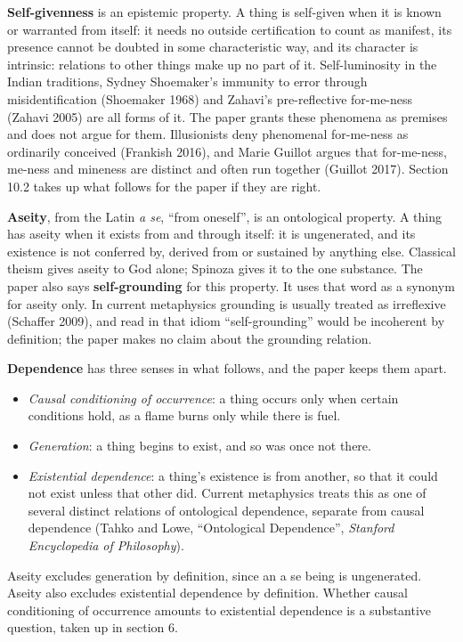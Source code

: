 \documentclass[11pt]{article}
\begin{document}
\textbf{Self-givenness} is an epistemic property. A thing is self-given when it is known or warranted from itself: it needs no outside certification to count as manifest, its presence cannot be doubted in some characteristic way, and its character is intrinsic: relations to other things make up no part of it. Self-luminosity in the Indian traditions, Sydney Shoemaker's immunity to error through misidentification (Shoemaker 1968) and Zahavi's pre-reflective for-me-ness (Zahavi 2005) are all forms of it. The paper grants these phenomena as premises and does not argue for them. Illusionists deny phenomenal for-me-ness as ordinarily conceived (Frankish 2016), and Marie Guillot argues that for-me-ness, me-ness and mineness are distinct and often run together (Guillot 2017). Section 10.2 takes up what follows for the paper if they are right.

\textbf{Aseity}, from the Latin \emph{a se}, ``from oneself'', is an ontological property. A thing has aseity when it exists from and through itself: it is ungenerated, and its existence is not conferred by, derived from or sustained by anything else. Classical theism gives aseity to God alone; Spinoza gives it to the one substance. The paper also says \textbf{self-grounding} for this property. It uses that word as a synonym for aseity only. In current metaphysics grounding is usually treated as irreflexive (Schaffer 2009), and read in that idiom ``self-grounding'' would be incoherent by definition; the paper makes no claim about the grounding relation.

\textbf{Dependence} has three senses in what follows, and the paper keeps them apart.

\begin{itemize}
\item \emph{Causal conditioning of occurrence}: a thing occurs only when certain conditions hold, as a flame burns only while there is fuel.
\item \emph{Generation}: a thing begins to exist, and so was once not there.
\item \emph{Existential dependence}: a thing's existence is from another, so that it could not exist unless that other did. Current metaphysics treats this as one of several distinct relations of ontological dependence, separate from causal dependence (Tahko and Lowe, ``Ontological Dependence'', \emph{Stanford Encyclopedia of Philosophy}).
\end{itemize}
Aseity excludes generation by definition, since an a se being is ungenerated. Aseity also excludes existential dependence by definition. Whether causal conditioning of occurrence amounts to existential dependence is a substantive question, taken up in section 6.
\end{document}
